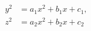 \begin{proposition}\label{eq:031}
\[
    \begin{aligned}y^2&=a_1x^2+b_1x+c_1,\\z^2&=a_2x^2+b_2x+c_2\end{aligned}
\]
\end{proposition}
